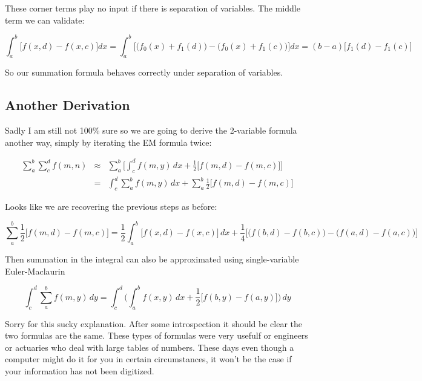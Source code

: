 \documentclass[12pt]{article}
\begin{document}
{\noindent These corner terms play no input if there is separation of variables.  The middle term we can validate:

$$ \int_a^b \Big[ f(x,d) - f(x,c) \Big] dx 
=\int_a^b \Big[ \big(f_0(x) + f_1(d)\big)  -\big(f_0(x) + f_1(c)\big)  \Big] dx  = 
(b-a) \Big[  f_1(d)  - f_1(c)  \Big]  
 $$

\noindent So our summation formula behaves correctly under separation of variables.

\subsection{Another Derivation}

Sadly I am still not 100\% sure so we are going to derive the 2-variable formula another way, simply by iterating the EM formula twice:

\begin{eqnarray*} \sum_{a}^b \sum_{c}^d f(m,n) &\approx&
 \sum_{a}^b \bigg[ \int_c^d f(m,y) \, dx + \frac{1}{2}\big[ f(m,d) - f(m,c) \big] \bigg] \\
 &=&    \int_c^d \sum_{a}^b f(m,y) \, dx + \sum_{a}^b\frac{1}{2}\big[ f(m,d) - f(m,c) \big] \end{eqnarray*}
 
\noindent Looks like we are recovering the previous steps as before:
 
 $$ \sum_{a}^b\frac{1}{2}\big[ f(m,d) - f(m,c) \big] =  \frac{1}{2}\int_a^b \bigg[ f(x,d) - f(x,c) \bigg]\, dx + 
\frac{1}{4} \bigg[ \big( f(b,d) - f(b,c)) - ( f(a,d) - f(a,c)\big)\bigg]
$$

\noindent Then summation in the integral can also be approximated using single-variable Euler-Maclaurin

$$ \int_c^d \sum_{a}^b f(m,y) \, dy  
 = \int_c^d \bigg( \int_a^b f(x,y) \, dx + \frac{1}{2} \bigg[ f(b,y) - f(a,y) \bigg] \bigg) \, dy $$

\noindent Sorry for this sucky explanation.  After some introspection it should be clear the two formulas are the same.  These types of formulas were very usefulf or engineers or actuaries who deal with large tables of numbers.  These days even though a computer might do it for you in certain circumstances, it won't be the case if your information has not been digitized. \newline


}
\end{document}
